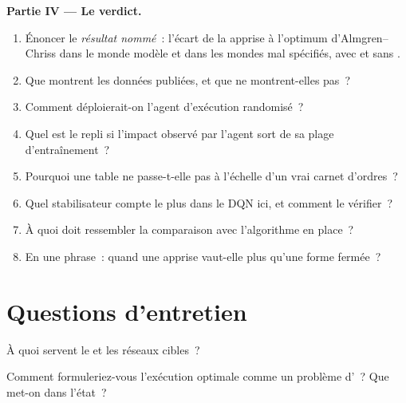 \begin{problem}
\medskip\noindent\textbf{Partie IV --- Le verdict.}
\begin{enumerate}[resume]
\item Énoncer le \emph{résultat nommé}~: l'écart de la  apprise à l'optimum d'Almgren--Chriss dans le monde modèle et
dans les mondes mal spécifiés, avec et sans .
\item Que montrent les données publiées, et que ne montrent-elles pas~?
\item Comment déploierait-on l'agent d'exécution randomisé~?
\item Quel est le repli si l'impact observé par l'agent sort de sa plage d'entraînement~?
\item Pourquoi une table ne passe-t-elle pas à l'échelle d'un vrai carnet d'ordres~?
\item Quel stabilisateur compte le plus dans le DQN ici, et comment le vérifier~?
\item À quoi doit ressembler la comparaison avec l'algorithme en place~?
\item En une phrase~: quand une  apprise vaut-elle plus qu'une forme fermée~?
\end{enumerate}
\end{problem}

\section{Questions d'entretien}

\begin{interviewq}\label{iq:ml:reinforcement-learning-for-execution-and-market-making:1}
À quoi servent le  et les réseaux cibles~?
\end{interviewq}

\begin{interviewq}\label{iq:ml:reinforcement-learning-for-execution-and-market-making:2}
Comment formuleriez-vous l'exécution optimale comme un problème d'~? Que met-on dans l'état~?
\end{interviewq}

